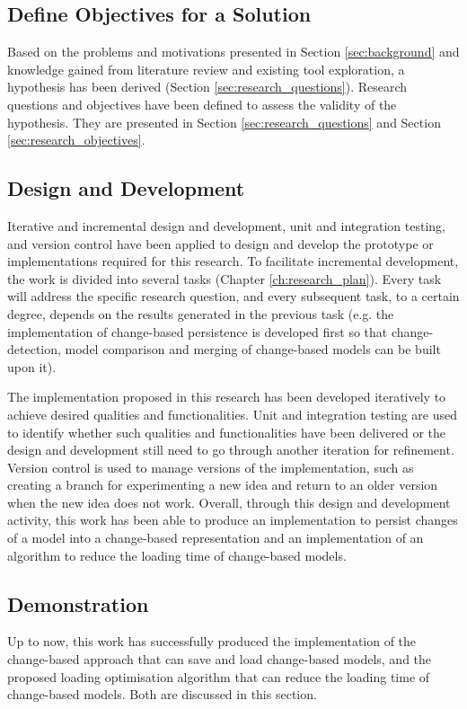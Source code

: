 \documentclass[12pt, a4paper]{report} \usepackage[titletoc]{appendix}
\begin{document}
\subsection{Define Objectives for a Solution}
\label{subsec:define_objectives_for_a_solution}
Based on the problems and motivations presented in Section \ref{sec:background} and knowledge gained from literature review and existing tool exploration, a hypothesis has been derived (Section \ref{sec:research_questions}). Research questions and objectives have been defined to assess the validity of the hypothesis. They are presented in Section \ref{sec:research_questions} and Section \ref{sec:research_objectives}. 
        
\subsection{Design and Development}
\label{subsec:design_and_development}
Iterative and incremental design and development, unit and integration testing, and version control have been applied to design and develop the prototype or implementations required for this research. To facilitate incremental development, the work is divided into several tasks (Chapter \ref{ch:research_plan}). Every task will address the specific research question, and every subsequent task, to a certain degree, depends on the results generated in the previous task (e.g. the implementation of change-based persistence is developed first so that change-detection, model comparison and merging of change-based models can be built upon it). 

The implementation proposed in this research has been developed iteratively to achieve desired qualities and functionalities. Unit and integration testing are used to identify whether such qualities and functionalities have been delivered or the design and development still need to go through another iteration for refinement. Version control is used to manage versions of the implementation, such as creating a branch for experimenting a new idea and return to an older version when the new idea does not work. Overall, through this design and development activity, this work has been able to produce an implementation to persist changes of a model into a change-based representation and an implementation of an algorithm to reduce the loading time of change-based models.

\subsection{Demonstration}
\label{subsec:demonstration}
Up to now, this work has successfully produced the implementation of the change-based approach that can save and load change-based models, and the proposed loading optimisation algorithm that can reduce the loading time of change-based models. Both are discussed in this section. 
\end{document}
